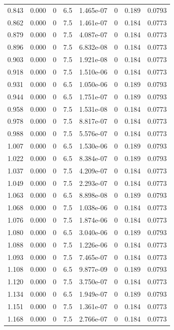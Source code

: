 \documentclass[preview]{standalone}
\begin{document}
{{{\begin{tabular}{L{1.2cm}C{1.2cm} C{0.3cm}C{0.5cm} C{1.4cm}C{1.4cm} C{1.4cm}C{1.4cm}}
  0.843  &  0.000  & 0     & 6.5 &  1.465e-07  & 0  & 0.189 &  0.0793   \\ 
  0.862  &  0.000  & 0     & 7.5 &  1.461e-07  & 0  & 0.184 &  0.0773   \\ 
  0.879  &  0.000  & 0     & 7.5 &  4.087e-07  & 0  & 0.184 &  0.0773   \\ 
  0.896  &  0.000  & 0     & 7.5 &  6.832e-08  & 0  & 0.184 &  0.0773   \\ 
  0.903  &  0.000  & 0     & 7.5 &  1.921e-08  & 0  & 0.184 &  0.0773   \\ 
  0.918  &  0.000  & 0     & 7.5 &  1.510e-06  & 0  & 0.184 &  0.0773   \\ 
  0.931  &  0.000  & 0     & 6.5 &  1.050e-06  & 0  & 0.189 &  0.0793   \\ 
  0.944  &  0.000  & 0     & 6.5 &  1.751e-07  & 0  & 0.189 &  0.0793   \\ 
  0.958  &  0.000  & 0     & 7.5 &  1.531e-08  & 0  & 0.184 &  0.0773   \\ 
  0.978  &  0.000  & 0     & 7.5 &  8.817e-07  & 0  & 0.184 &  0.0773   \\ 
  0.988  &  0.000  & 0     & 7.5 &  5.576e-07  & 0  & 0.184 &  0.0773   \\ 
  1.007  &  0.000  & 0     & 6.5 &  1.530e-06  & 0  & 0.189 &  0.0793   \\ 
  1.022  &  0.000  & 0     & 6.5 &  8.384e-07  & 0  & 0.189 &  0.0793   \\ 
  1.037  &  0.000  & 0     & 7.5 &  4.209e-07  & 0  & 0.184 &  0.0773   \\ 
  1.049  &  0.000  & 0     & 7.5 &  2.293e-07  & 0  & 0.184 &  0.0773   \\ 
  1.063  &  0.000  & 0     & 6.5 &  8.898e-08  & 0  & 0.189 &  0.0793   \\ 
  1.068  &  0.000  & 0     & 7.5 &  1.038e-06  & 0  & 0.184 &  0.0773   \\ 
  1.076  &  0.000  & 0     & 7.5 &  1.874e-06  & 0  & 0.184 &  0.0773   \\ 
  1.080  &  0.000  & 0     & 6.5 &  3.040e-06  & 0  & 0.189 &  0.0793   \\ 
  1.088  &  0.000  & 0     & 7.5 &  1.226e-06  & 0  & 0.184 &  0.0773   \\ 
  1.093  &  0.000  & 0     & 7.5 &  7.465e-07  & 0  & 0.184 &  0.0773   \\ 
  1.108  &  0.000  & 0     & 6.5 &  9.877e-09  & 0  & 0.189 &  0.0793   \\ 
  1.120  &  0.000  & 0     & 7.5 &  3.750e-07  & 0  & 0.184 &  0.0773   \\ 
  1.134  &  0.000  & 0     & 6.5 &  1.949e-07  & 0  & 0.189 &  0.0793   \\ 
  1.151  &  0.000  & 0     & 7.5 &  1.361e-07  & 0  & 0.184 &  0.0773   \\ 
  1.168  &  0.000  & 0     & 7.5 &  2.766e-07  & 0  & 0.184 &  0.0773   \\ 
\hline 
\end{tabular} 

}}}
\end{document}
